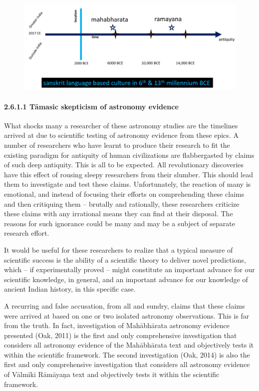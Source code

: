 \begin{figure}[!htbp]
\includegraphics[scale=0.19]{images/8-13.jpg}
\caption{}\label{art8-fig13}
\end{figure}


\paragraph*{2.6.1.1 Tāmasic skepticism of astronomy evidence}

What shocks many a researcher of these astronomy studies are the timelines arrived at due to scientific testing of astronomy evidence from these epics. A number of researchers who have learnt to produce their research to fit the existing paradigm for antiquity of human civilizations are flabbergasted by claims of such deep antiquity. This is all to be expected. All revolutionary discoveries have this effect of rousing sleepy researchers from their slumber. This should lead them to investigate and test these claims. Unfortunately, the reaction of many is emotional, and instead of focusing their efforts on comprehending these claims and then critiquing them – brutally and rationally, these researchers criticize these claims with any irrational means they can find at their disposal. The reasons for such ignorance could be many and may be a subject of separate research effort.

It would be useful for these researchers to realize that a typical measure of scientific success is the ability of a scientific theory to deliver novel predictions, which – if experimentally proved – might constitute an important advance for our scientific knowledge, in general, and an important advance for our knowledge of ancient Indian history, in this specific case.

A recurring and false accusation, from all and sundry, claims that these claims were arrived at based on one or two isolated astronomy observations. This is far from the truth. In fact, investigation of Mahābhārata astronomy evidence presented (Oak, 2011) is the first and only comprehensive investigation that considers all astronomy evidence of the Mahābhārata text and objectively tests it within the scientific framework. The second investigation (Oak, 2014) is also the first and only comprehensive investigation that considers all astronomy evidence of Vālmīki Rāmāyaņa text and objectively tests it within the scientific framework.


